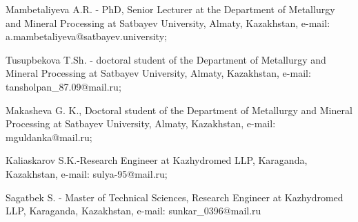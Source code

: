 Mambetaliyeva A.R. - PhD, Senior Lecturer at the Department of
Metallurgy and Mineral Processing at Satbayev University, Almaty,
Kazakhstan, e-mail: a.mambetaliyeva@satbayev.university;

Tusupbekova T.Sh. - doctoral student of the Department of Metallurgy and
Mineral Processing at Satbayev University, Almaty, Kazakhstan, e-mail:
tansholpan\_87.09@mail.ru;

Makasheva G. K., Doctoral student of the Department of Metallurgy and
Mineral Processing at Satbayev University, Almaty, Kazakhstan, e-mail:
mguldanka@mail.ru;

Kaliaskarov S.K.-Research Engineer at Kazhydromed LLP, Karaganda,
Kazakhstan, e-mail: sulya-95@mail.ru;

Sagatbek S. - Master of Technical Sciences, Research Engineer at
Kazhydromed LLP, Karaganda, Kazakhstan, e-mail: sunkar\_0396@mail.ru




